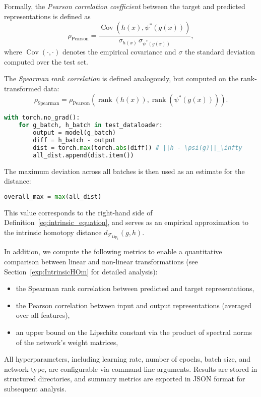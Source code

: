 Formally, the \emph{Pearson correlation coefficient} between the target and predicted representations is defined as
\[
\rho_{\mathrm{Pearson}} = \frac{\operatorname{Cov}(h(x), \psi^*(g(x)))}{\sigma_{h(x)} \, \sigma_{\psi^*(g(x))}},
\]
where \( \operatorname{Cov}(\cdot, \cdot) \) denotes the empirical covariance and \( \sigma \) the standard deviation computed over the test set.

The \emph{Spearman rank correlation} is defined analogously, but computed on the rank-transformed data:
\[
\rho_{\mathrm{Spearman}} = \rho_{\mathrm{Pearson}}(\operatorname{rank}(h(x)), \operatorname{rank}(\psi^*(g(x)))).
\]



\begin{lstlisting}[language=Python, caption={Computation of $\|h(x) - \psi(g(x))\|_\infty$ in PyTorch}, label={lst:linf-computation}]
with torch.no_grad():
    for g_batch, h_batch in test_dataloader:
        output = model(g_batch)
        diff = h_batch - output
        dist = torch.max(torch.abs(diff)) # ||h - \psi(g)||_\infty
        all_dist.append(dist.item())
\end{lstlisting}

The maximum deviation across all batches is then used as an estimate for the distance:
\begin{lstlisting}[language=Python]
overall_max = max(all_dist)
\end{lstlisting}

This value corresponds to the right-hand side of Definition~\ref{eq:intrinsic_equation}, and serves as an empirical approximation to the intrinsic homotopy distance \( d_{\mathcal{F}_{\mathrm{Lip}_1}}(g, h) \).

In addition, we compute the following metrics to enable a quantitative comparison between linear and non-linear transformations (see Section~\ref{exp:IntrinsicHOm} for detailed analysis):

\begin{itemize}
    \item the Spearman rank correlation between predicted and target representations,
    \item the Pearson correlation between input and output representations (averaged over all features),
    \item an upper bound on the Lipschitz constant via the product of spectral norms of the network's weight matrices,
\end{itemize}

All hyperparameters, including learning rate, number of epochs, batch size, and network type, are configurable via command-line arguments. 
Results are stored in structured directories, and summary metrics are exported in JSON format for subsequent analysis.

